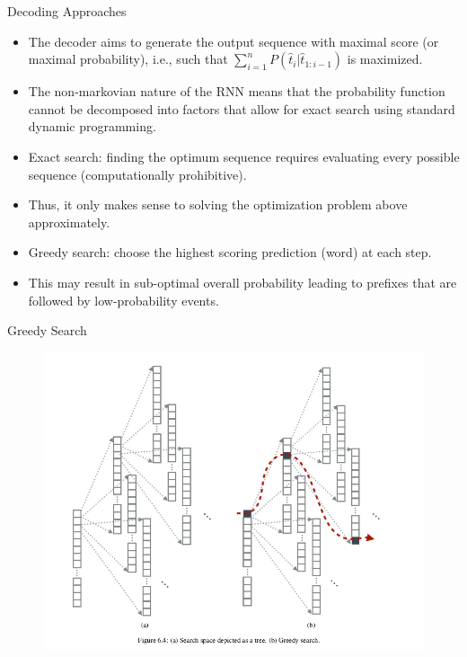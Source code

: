 \documentclass[handout]{beamer}
\begin{document}
\begin{frame}{Decoding Approaches}
\begin{scriptsize}
\begin{itemize}
\item The decoder aims to generate  the output sequence with maximal score (or maximal probability), i.e., such that $\sum_{i=1}^{n}P(\hat{t}_i | \hat{t}_{1:i-1})$ is maximized. 
\item The non-markovian nature of the RNN means that the probability function cannot be decomposed into factors that allow for exact search using standard dynamic programming.
\item Exact search: finding the optimum sequence requires evaluating every possible sequence (computationally prohibitive).
\item Thus, it only makes sense to solving the optimization problem above approximately.
\item Greedy search: choose the highest scoring prediction (word) at each step.
\item This may result in sub-optimal overall probability leading to
prefixes that are followed by low-probability events.

\end{itemize}
        
        
\end{scriptsize}
\end{frame}


\begin{frame}{Greedy Search}
        
         \begin{figure}[h]
        	\includegraphics[scale = 0.3]{pics/greedysearch.png}
        \end{figure}        
        
        
        
        
\end{frame}
\end{document}
